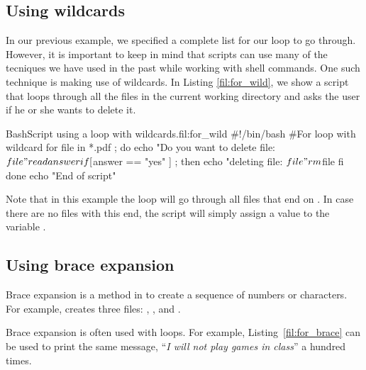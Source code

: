 \subsection{Using wildcards}

In our previous example, we specified a complete list for our  loop to go through. However, it is important to keep in mind that  scripts can use many of the tecniques we have used in the past while working with shell commands. One such technique is making use of wildcards. In Listing \ref{fil:for_wild}, we show a script that loops through all the  files in the current working directory and asks the user if he or she wants to delete it.

\begin{source_code_float}{Bash}{Script using a  loop with wildcards.}{fil:for_wild}
#!/bin/bash
#For loop with wildcard 
for file in *.pdf ; do
   echo "Do you want to delete file: $file"
   read answer
   if [ $answer == "yes" ] ; then
       echo "deleting file: $file"
       rm $file
   fi
done
echo "End of script"
\end{source_code_float}
Note that in this example the loop will go through all files that end on . In case there are no files with this end, the script will simply assign a value  to the variable .

\subsection{Using brace expansion}

Brace expansion is a method in  to create a sequence of numbers or characters. For example,  creates three files: , , and . 

Brace expansion is often used with  loops. For example, Listing~\ref{fil:for_brace} can be used to print the same message, ``\textit{I will not play games in class}'' a hundred times.


